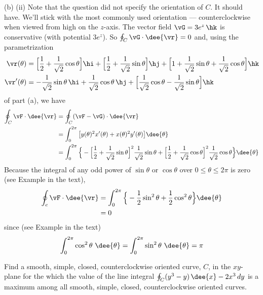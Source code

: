 \begin{solution}
\noindent (b) (ii) Note that the question did not specify the orientation
of $C$. It should have. We'll stick with the most commonly used orientation ---
counterclockwise when viewed from high on the $z$-axis.
The vector field $\vG= 3 e^z\,\hk$
is conservative (with potential $3e^z$).
So $\oint_C\vG\cdot\dee{\vr}=0$ and, using the parametrization
\begin{align*}
\vr(\theta) &= \Big[\frac{1}{2} +\frac{1}{\sqrt{2}}\cos\theta\Big]\hi
             +\Big[\frac{1}{2} +\frac{1}{\sqrt{2}}\sin\theta\Big]\hj
             +\Big[1 +\frac{1}{\sqrt{2}}\sin\theta
                     +\frac{1}{\sqrt{2}}\cos\theta\Big]\hk \\
\vr'(\theta) &= -\frac{1}{\sqrt{2}}\sin\theta\,\hi
                +\frac{1}{\sqrt{2}}\cos\theta\,\hj
             +\Big[\frac{1}{\sqrt{2}}\cos\theta
                     -\frac{1}{\sqrt{2}}\sin\theta\Big]\hk
\end{align*}
of part (a), we have
\begin{align*}
\oint_C\vF\cdot\dee{\vr}
&= \oint_C(\vF-\vG)\cdot\dee{\vr} \\
&= \int_0^{2\pi} \big[y(\theta)^2x'(\theta) +x(\theta)^2y'(\theta)\big]
           \dee{\theta} \\
&= \int_0^{2\pi} \Big\{-\Big[\frac{1}{2} +\frac{1}{\sqrt{2}}\sin\theta\Big]^2
                               \frac{1}{\sqrt{2}}\sin\theta
                       +\Big[\frac{1}{2} +\frac{1}{\sqrt{2}}\cos\theta\Big]^2
                               \frac{1}{\sqrt{2}}\cos\theta\Big\}
           \dee{\theta}
\end{align*}
Because the integral of any odd power of $\sin\theta$ or $\cos\theta$
over $0\le\theta\le 2\pi$ is zero (see Example 
in the  text),
\begin{align*}
\oint_c\vF\cdot\dee{\vr}
&= \int_0^{2\pi} \Big\{-\frac{1}{2} \sin^2\theta
                       +\frac{1}{2} \cos^2\theta\Big\}
           \dee{\theta} \\
&=0
\end{align*}
since  (see Example  in the  text)
\begin{equation*}
\int_0^{2\pi}\cos^2\theta\ \dee{\theta}
=\int_0^{2\pi}\sin^2\theta\ \dee{\theta}
=\pi
\end{equation*}
\end{solution}

\begin{question}
 Find a smooth, simple, closed,
counterclockwise oriented curve, $C$, in the $xy$-plane for the which
the value of the line integral
 $\oint_C(y^3-y)\,\dee{x}-2x^3\,dy$ is a maximum among all
smooth, simple, closed, counterclockwise oriented curves.
\end{question}

